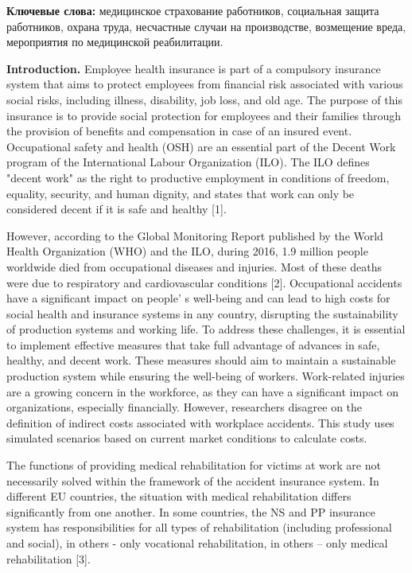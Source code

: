 {\bfseries Ключевые слова:} медицинское страхование работников, социальная
защита работников, охрана труда, несчастные случаи на производстве,
возмещение вреда, мероприятия по медицинской реабилитации.
\begin{multicols}{2}

{\bfseries Introduction.} Employee health insurance is part of a compulsory
insurance system that aims to protect employees from financial risk
associated with various social risks, including illness, disability, job
loss, and old age. The purpose of this insurance is to provide social
protection for employees and their families through the provision of
benefits and compensation in case of an insured event. Occupational
safety and health (OSH) are an essential part of the Decent Work program
of the International Labour Organization (ILO). The ILO defines "decent
work" as the right to productive employment in conditions of freedom,
equality, security, and human dignity, and states that work can only be
considered decent if it is safe and healthy {[}1{]}.

However, according to the Global Monitoring Report published by the
World Health Organization (WHO) and the ILO, during 2016, 1.9 million
people worldwide died from occupational diseases and injuries. Most of
these deaths were due to respiratory and cardiovascular conditions
{[}2{]}. Occupational accidents have a significant impact on
people' s well-being and can lead to high costs for
social health and insurance systems in any country, disrupting the
sustainability of production systems and working life. To address these
challenges, it is essential to implement effective measures that take
full advantage of advances in safe, healthy, and decent work. These
measures should aim to maintain a sustainable production system while
ensuring the well-being of workers. Work-related injuries are a growing
concern in the workforce, as they can have a significant impact on
organizations, especially financially. However, researchers disagree on
the definition of indirect costs associated with workplace accidents.
This study uses simulated scenarios based on current market conditions
to calculate costs.

The functions of providing medical rehabilitation for victims at work
are not necessarily solved within the framework of the accident
insurance system. In different EU countries, the situation with medical
rehabilitation differs significantly from one another. In some
countries, the NS and PP insurance system has responsibilities for all
types of rehabilitation (including professional and social), in others -
only vocational rehabilitation, in others -- only medical rehabilitation
{[}3{]}.


\end{multicols}
